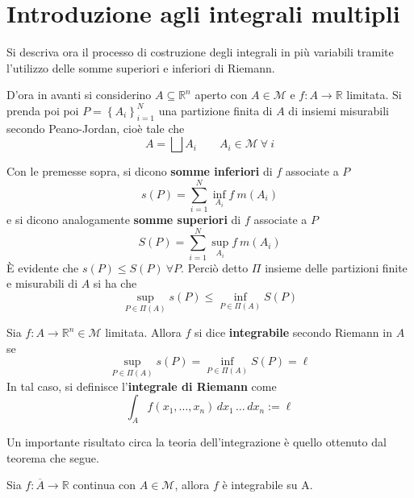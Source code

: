 \section{Introduzione agli integrali multipli}
Si descriva ora il processo di costruzione degli integrali in più variabili tramite l'utilizzo delle somme superiori e inferiori di Riemann.

D'ora in avanti si considerino $A \subseteq \mathbb{R}^n$ aperto con $A \in \mathcal{M}$ e $f:A \to \mathbb{R}$ limitata. Si prenda poi poi $P=\left\{ A_i \right\}_{i=1}^{N}$ una partizione finita di $A$ di insiemi misurabili secondo Peano-Jordan, cioè tale che
    \begin{equation}
    A= \bigsqcup A_i \qquad A_i \in \mathcal{M}\ \forall\ i
    \end{equation}
\begin{definition} \label{Def: Somme di Riemann}
Con le premesse sopra, si dicono \textbf{somme inferiori} di $f$ associate a $P$
\begin{equation}
    s(P)= \sum\limits_{i=1}^{N}\inf_{A_i} f\ m(A_i)
\end{equation}
e si dicono analogamente \textbf{somme superiori} di $f$ associate a $P$
\begin{equation}
    S(P)= \sum\limits_{i=1}^{N}\sup_{A_i}f\ m(A_i)
\end{equation}
È evidente che $s(P) \leq S(P)\ \forall P$.
Perciò detto $\Pi$ insieme delle partizioni finite e misurabili di $A$ si ha che
\begin{equation}
    \sup_{P \in \Pi(A)} s(P) \leq \inf_{P \in \Pi(A)} S(P)
\end{equation}
\end{definition}
\begin{definition} \label{Def: Integrale e integrabilità}
    Sia $f: A \to \mathbb{R}^n \in \mathcal{M}$ limitata. Allora $f$ si dice \textbf{integrabile} secondo Riemann in $A$ se 
    \begin{equation}
        \sup_{P \in \Pi(A)} s(P) = \inf_{P \in \Pi(A)} S(P)= \ell
    \end{equation}
    In tal caso, si definisce l'\textbf{integrale di Riemann} come
    \begin{equation}
        \int_A{f(x_1, \dots, x_n)}\,dx_1\,\dots\,dx_n := \ell
    \end{equation}
\end{definition}
Un importante risultato circa la teoria dell'integrazione è quello ottenuto dal teorema che segue.
\begin{theorem} \label{Teo: Integrabilità di funzioni continue}
    Sia $f: \overline{A} \to \mathbb{R}$ continua con $A \in \mathcal{M}$, allora $f$ è integrabile su A.
\end{theorem}

